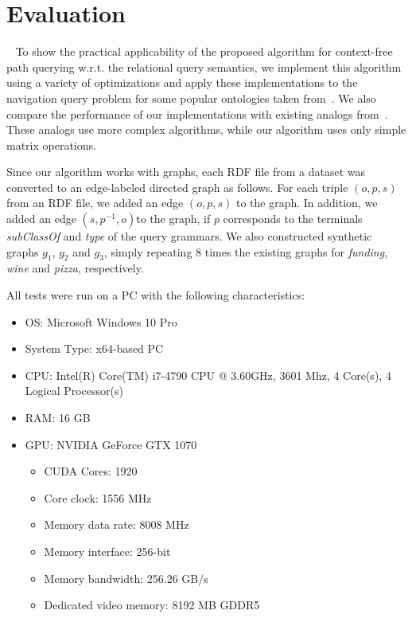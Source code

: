 \section{Evaluation} ~\label{section_evaluation}
To show the practical applicability of the proposed algorithm for context-free path querying w.r.t. the relational query semantics, we implement this algorithm using a variety of optimizations and apply these implementations to the navigation query problem for some popular ontologies taken from~\cite{RDF}. We also compare the performance of our implementations with existing analogs from~\cite{GLL,RDF}. These analogs use more complex algorithms, while our algorithm uses only simple matrix operations.

Since our algorithm works with graphs, each RDF file from a dataset was converted to an edge-labeled directed graph as follows. For each triple $(o,p,s)$ from an RDF file, we added an edge $(o,p,s)$ to the graph. In addition, we added an edge $(s,p^{-1},o)$to the graph, if $p$ corresponds to the terminals \textit{subClassOf} and \textit{type} of the query grammars. We also constructed synthetic graphs $g_1$, $g_2$ and $g_3$, simply repeating $8$ times the existing graphs for \textit{funding}, \textit{wine} and \textit{pizza}, respectively.

All tests were run on a PC with the following characteristics:
\begin{itemize}
    \item OS: Microsoft Windows 10 Pro
    \item System Type: x64-based PC
    \item CPU: Intel(R) Core(TM) i7-4790 CPU @ 3.60GHz, 3601 Mhz, 4 Core(s), 4 Logical Processor(s)
    \item RAM: 16 GB
    \item GPU: NVIDIA GeForce GTX 1070
    \begin{itemize}
        \item CUDA Cores:		1920 
        \item Core clock:		1556 MHz 
        \item Memory data rate:	8008 MHz
        \item Memory interface:	256-bit 
        \item Memory bandwidth:	256.26 GB/s
        \item Dedicated video memory:	8192 MB GDDR5
    \end{itemize}
\end{itemize}

